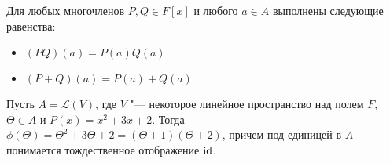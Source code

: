 \begin{note}
	Для любых многочленов $P, Q \in F[x]$ и любого $a \in A$ выполнены следующие равенства:
	\begin{itemize}
		\item $(PQ)(a) = P(a)Q(a)$
		\item $(P + Q)(a) = P(a) + Q(a)$
	\end{itemize}
\end{note}

\begin{example}
	Пусть $A = \mathcal{L}(V)$, где $V$ "--- некоторое линейное пространство над полем $F$, $\Theta \in A$ и $P(x) = x^2 + 3x + 2$. Тогда $\phi(\Theta) = \Theta^2 + 3\Theta + 2 = (\Theta + 1)(\Theta + 2)$, причем под единицей в $A$ понимается тождественное отображение $\mathrm{id}$.
\end{example}